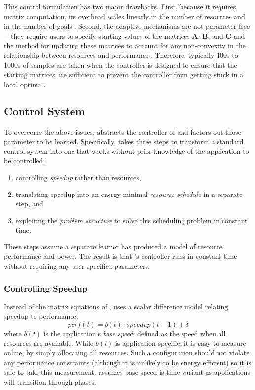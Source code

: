 This control formulation has two major drawbacks.  First, because it
requires matrix computation, its overhead scales linearly in the
number of resources and in the number of goals
\cite{Hellerstein2004a,METE}.  Second, the adaptive mechanisms are not
parameter-free---they require users to specify starting values of the
matrices $\mathbf{A}$, $\mathbf{B}$, and $\mathbf{C}$ and the method
for updating these matrices to account for any non-convexity in the
relationship between resources and performance
\cite{POET,METE,ControlWare,AdaptiveControl}.  Therefore, typically
100s to 1000s of samples are taken when the controller is designed to
ensure that the starting matrices are sufficient to prevent the
controller from getting stuck in a local optima
\cite{FSE2015,sysid,josep-isca2016}.

\subsection{\SYSTEM{} Control System}
To overcome the above issues, \SYSTEM{} abstracts the controller of
 and factors out those parameter to be learned.
Specifically, \SYSTEM{} takes three steps to transform a standard
control system into one that works without prior knowledge of the
application to be controlled:
\begin{enumerate}[leftmargin=1em]
\item controlling \emph{speedup} rather than resources,
\item translating speedup into an energy minimal \emph{resource
    schedule} in a separate step, and
\item exploiting the \emph{problem structure} to solve this scheduling
  problem in constant time.
\end{enumerate}
These steps assume a separate learner has produced a model of resource
performance and power.  The result is that \SYSTEM{}'s controller runs
in constant time without requiring any user-specified parameters.



\subsubsection{Controlling Speedup}
Instead of the matrix equations of , \SYSTEM{}
uses a scalar difference model relating speedup to performance:
\begin{equation}
  perf(t) = b(t) \cdot speedup(t-1) + \delta \label{eqn:speedup}
\end{equation}
where $b(t)$ is the application's \emph{base speed}: defined as the
speed when all resources are available.  While $b(t)$ is application
specific, it is easy to measure online, by simply allocating all
resources. Such a configuration should not violate any performance
constraints (although it is unlikely to be energy efficient) so it is
safe to take this measurement.  \SYSTEM{} assumes base speed is
time-variant as applications will transition through phases.


